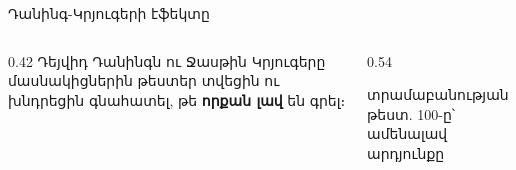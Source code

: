 \begin{frame}{Դանինգ-Կրյուգերի էֆեկտը}
  \begin{columns}[c]
    \begin{column}{0.42\textwidth}
      Դեյվիդ Դանինգն ու Ջասթին Կրյուգերը մասնակիցներին թեստեր տվեցին ու խնդրեցին գնահատել, թե \textbf{որքան լավ} են գրել։\par\medskip
    \end{column}
    \begin{column}{0.54\textwidth}
      \centering
      {\scriptsize\color{plum!70!cream} տրամաբանության թեստ. 100-ը՝ ամենալավ արդյունքը\par}
    \end{column}
  \end{columns}
\end{frame}

